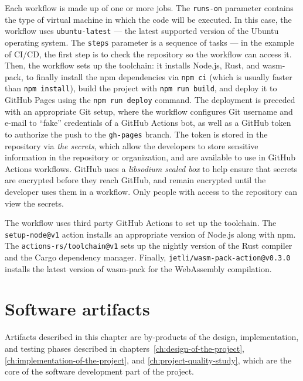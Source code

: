 \documentclass[english,engineering]{wizthesis}
\begin{document}
Each workflow is made up of one or more jobs. The \texttt{runs-on} parameter
contains the type of virtual machine in which the code will be executed. In this
case, the workflow uses \texttt{ubuntu-latest} --- the latest supported version
of the Ubuntu operating system. The \texttt{steps} parameter is a sequence of
tasks --- in the example of CI/CD, the first step is to check the repository so
the workflow can access it. Then, the workflow sets up the toolchain: it
installs Node.js, Rust, and wasm-pack, to finally install the npm dependencies
via \texttt{npm ci} (which is usually faster than \texttt{npm install}), build
the project with \texttt{npm run build}, and deploy it to GitHub Pages using the
\texttt{npm run deploy} command. The deployment is preceded with an appropriate
Git setup, where the workflow configures Git username and e-mail to ``fake''
credentials of a GitHub Actions bot, as well as a GitHub token to authorize the
push to the \texttt{gh-pages} branch. The token is stored in the repository via
\emph{the secrets}, which allow the developers to store sensitive information in
the repository or organization, and are available to use in GitHub Actions
workflows. GitHub uses a \emph{libsodium sealed box} to help ensure that secrets
are encrypted before they reach GitHub, and remain encrypted until the developer
uses them in a workflow. Only people with access to the repository can view the
secrets.

The workflow uses third party GitHub Actions to set up the toolchain. The
\verb|setup-node@v1| action installs an appropriate version of Node.js along
with npm. The \verb|actions-rs/toolchain@v1| sets up the nightly version of
the Rust compiler and the Cargo dependency manager. Finally,
\verb|jetli/wasm-pack-action@v0.3.0| installs the latest version of wasm-pack
for the Web\-Assembly compilation.


\chapter{Software artifacts}

Artifacts described in this chapter are by-products of the design,
implementation, and testing phases described in
chapters~\ref{ch:design-of-the-project}, \ref{ch:implementation-of-the-project},
and \ref{ch:project-quality-study}, which are the core of the software
development part of the project.
\end{document}
